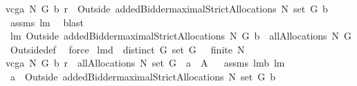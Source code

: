 \begin{isabellebody}
{\isachardoublequoteopen}vcga{\isacharprime}\ N\ G\ b\ r\ {\isasymin}\ {\isacharparenleft}Outside{\isacharprime}\ {\isacharbraceleft}addedBidder{\isacharprime}{\isacharbraceright}{\isacharparenright}{\isacharbackquote}{\isacharparenleft}maximalStrictAllocations{\isacharprime}\ N\ {\isacharparenleft}set\ G{\isacharparenright}\ b{\isacharparenright}{\isachardoublequoteclose}\isanewline
%
\isadelimproof
%
\endisadelimproof
%
\isatagproof
{}\isamarkupfalse%
\ assms\ lm{}{}\ \isamarkupfalse%
\ blast%
\endisatagproof
{\isafoldproof}%
%
\isadelimproof
\isanewline
%
\endisadelimproof
\isanewline
{}\isamarkupfalse%
\ lm{}{}{\isacharcolon}\ {\isachardoublequoteopen}{\isacharparenleft}Outside{\isacharprime}\ {\isacharbraceleft}addedBidder{\isacharprime}{\isacharbraceright}{\isacharparenright}{\isacharbackquote}{\isacharparenleft}maximalStrictAllocations{\isacharprime}\ N\ G\ b{\isacharparenright}\ {\isasymsubseteq}\ allAllocations{\isacharprime}\ N\ G{\isachardoublequoteclose}\isanewline
%
\isadelimproof
%
\endisadelimproof
%
\isatagproof
{}\isamarkupfalse%
\ Outside{\isacharunderscore}def\ \isamarkupfalse%
\ force%
\endisatagproof
{\isafoldproof}%
%
\isadelimproof
\isanewline
%
\endisadelimproof
\isanewline
{}\isamarkupfalse%
\ lm{}{}d{\isacharcolon}\ \ {\isachardoublequoteopen}distinct\ G{\isachardoublequoteclose}\ {\isachardoublequoteopen}set\ G\ {\isasymnoteq}\ {\isacharbraceleft}{\isacharbraceright}{\isachardoublequoteclose}\ {\isachardoublequoteopen}finite\ N{\isachardoublequoteclose}\ \ \isanewline
{\isachardoublequoteopen}vcga{\isacharprime}\ N\ G\ b\ r\ {\isasymin}\ allAllocations{\isacharprime}\ N\ {\isacharparenleft}set\ G{\isacharparenright}{\isachardoublequoteclose}\ {\isacharparenleft}\ {\isachardoublequoteopen}{\isacharquery}a\ {\isasymin}\ {\isacharquery}A{\isachardoublequoteclose}{\isacharparenright}%
\isadelimproof
\ %
\endisadelimproof
%
\isatagproof
{}\isamarkupfalse%
\ assms\ lm{}{}b\ lm{}{}\ \isanewline
{}\isamarkupfalse%
\ {\isacharminus}\ \isamarkupfalse%
\ {\isachardoublequoteopen}{\isacharquery}a\ {\isasymin}\ {\isacharparenleft}Outside{\isacharprime}\ {\isacharbraceleft}addedBidder{\isacharprime}{\isacharbraceright}{\isacharparenright}{\isacharbackquote}{\isacharparenleft}maximalStrictAllocations{\isacharprime}\ N\ {\isacharparenleft}set\ G{\isacharparenright}\ b{\isacharparenright}{\isachardoublequoteclose}\ \isanewline

\end{isabellebody}
